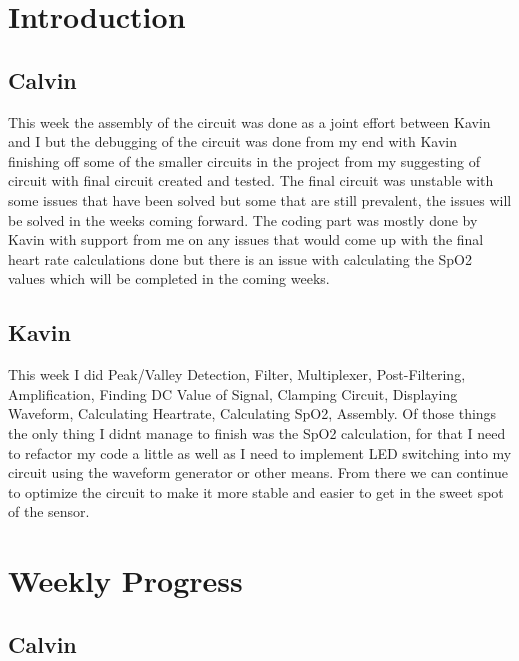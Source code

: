 \documentclass{article}
\begin{document}
\maketitle
\newpage
\tableofcontents
\newpage
\section{Introduction}
\subsection{Calvin}
This week the assembly of the circuit was done as a joint effort between Kavin and I but the debugging of the circuit was done from my end with Kavin finishing off some of the smaller circuits in the project from my suggesting of circuit with final circuit created and tested. The final circuit was unstable with some issues that have been solved but some that are still prevalent, the issues will be solved in the weeks coming forward. The coding part was mostly done by Kavin with support from me on any issues that would come up with the final heart rate calculations done but there is an issue with calculating the SpO2 values which will be completed in the coming weeks.
\subsection{Kavin}
This week I did Peak/Valley Detection, Filter, Multiplexer, Post-Filtering, Amplification, Finding DC Value of Signal, Clamping Circuit, Displaying Waveform, Calculating Heartrate, Calculating SpO2,
Assembly. Of those things the only thing I didnt manage to finish was the SpO2 calculation, for that I need to refactor my code a little as well as I need to implement LED switching into my circuit using the waveform generator or other means. From there we can continue to optimize the circuit to make it more stable and easier to get in the sweet spot of the sensor.
\newpage
\section{Weekly Progress}
\subsection{Calvin}
\end{document}
